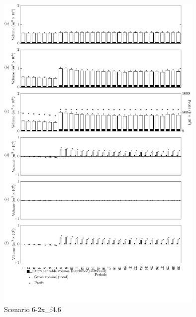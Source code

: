 \begin{figure}[h]
  \centering
  \includegraphics[width=10cm]{images/appendix/s6-2x_test60}
  \caption{Scenario 6-2x\_f4.6}
  \label{fig:s6-2x_test60}
\end{figure}

